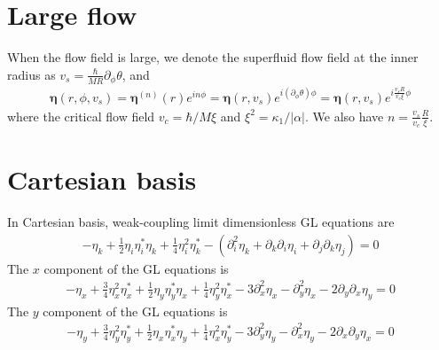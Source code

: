 \documentclass[aps,prl,preprint]{revtex4-2}
\begin{document}
\section{Large flow}

When the flow field is large, we denote the superfluid flow field at the inner radius as
$v_s = \frac{\hbar}{MR}\partial_\phi\theta$, and
\begin{align}
    \bm{\eta}(r, \phi, v_s)
    = \bm{\eta}^{(n)}(r) e^{in\phi} = \bm{\eta}(r, v_s)e^{i(\partial_\phi\theta)\phi}
    = \bm{\eta}(r, v_s)e^{i\frac{v_s R}{v_c \xi}\phi}
\end{align}
where the critical flow field $v_c = \hbar/M\xi$ and $\xi^2=\kappa_1/|\alpha|$.
We also have $n=\frac{v_s}{v_c}\frac{R}{\xi}$.

\section{Cartesian basis}

In Cartesian basis, weak-coupling limit dimensionless GL equations are
\begin{align}
    -\eta_k+\frac{1}{2}\eta_i\eta_i^*\eta_k
    +\frac{1}{4}\eta_i^2\eta_k^*-\left(\partial_i^2\eta_k
    +\partial_k\partial_i\eta_i
    +\partial_j\partial_k\eta_j\right) = 0
\end{align}
The $x$ component of the GL equations is
\begin{align}
    -\eta_x+\frac{3}{4}\eta_x^2\eta_x^*
    +\frac{1}{2}\eta_y\eta_y^*\eta_x
    +\frac{1}{4}\eta_y^2\eta_x^*
    -3\partial_x^2\eta_x - \partial_y^2\eta_x
    -2\partial_y\partial_x\eta_y = 0
\end{align}
The $y$ component of the GL equations is
\begin{align}
    -\eta_y+\frac{3}{4}\eta_y^2\eta_y^*
    +\frac{1}{2}\eta_x\eta_x^*\eta_y
    +\frac{1}{4}\eta_x^2\eta_y^*
    -3\partial_y^2\eta_y - \partial_x^2\eta_y
    -2\partial_x\partial_y\eta_x = 0
\end{align}
\end{document}
